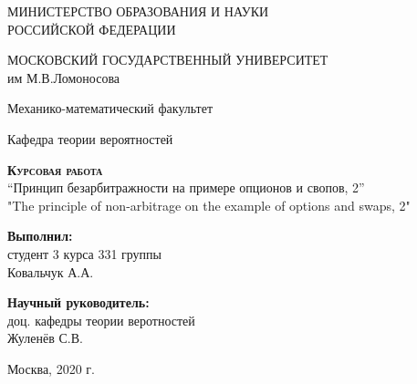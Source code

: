 \documentclass[12pt,a4 paper]{book}
\begin{document}
\begin{titlepage}
\begin{center}
\normalsize
МИНИСТЕРСТВО ОБРАЗОВАНИЯ И НАУКИ \\РОССИЙСКОЙ ФЕДЕРАЦИИ
\vspace{0.25cm}

МОСКОВСКИЙ ГОСУДАРСТВЕННЫЙ УНИВЕРСИТЕТ\\ им М.В.Ломоносова
\vspace{0.25cm}

Механико-математический факультет

Кафедра теории вероятностей
\vfill

\vfill

\textsc{\textbf{Курсовая работа}}\\[3mm]

{ “Принцип безарбитражности на примере опционов и свопов, 2” \\ "The principle of non-arbitrage on the example of options and swaps, 2" \\ }
\bigskip

\end{center}
\vfill

\newlength{\ML}
\hfill\begin{minipage}{0.4\textwidth}
\textbf{Выполнил:}\\ студент 3 курса 331 группы\\ Ковальчук А.А.

\end{minipage}%
\bigskip

\hfill\begin{minipage}{0.4\textwidth}
\textbf{Научный руководитель:}\\ доц. кафедры теории веротностей\\ Жуленёв С.В.
\end{minipage}%
\vfill

\begin{center}
\vfill

\vfill
Москва, 2020 г.
\end{center}
\end{titlepage}

\thispagestyle{empty}
\end{document}
